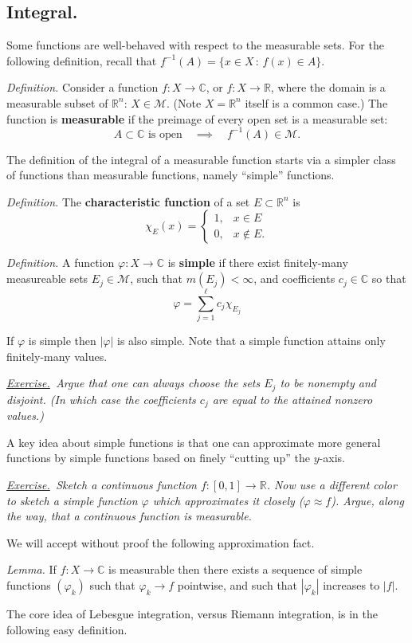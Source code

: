 \documentclass[12pt]{article}
\newcommand{\cM}{\mathcal{M}}
\newcommand{\CC}{\mathbb{C}}
\newcommand{\RR}{\mathbb{R}}
\newcommand{\sect}[1]{\subsection*{#1.}}
\newcommand{\defin}{\emph{Definition.}\,\,}
\newcommand{\lem}{\emph{Lemma.}\,\,}
\newcommand{\exer}[2]{\emph{\underline{Exercise.}\, #2} \vspace*{#1mm}}
\begin{document}
\sect{Integral}

Some functions are well-behaved with respect to the measurable sets.  For the following definition, recall that $f^{-1}(A)=\{x\in X\,:\,f(x)\in A\}$.

\defin Consider a function $f:X\to\CC$, or $f:X\to \RR$, where the domain is a measurable subset of $\RR^n$: $X \in \cM$.  (Note $X=\RR^n$ itself is a common case.)  The function is \textbf{measurable} if the preimage of every open set is a measurable set:
	$$A \subset \CC \text{ is open} \quad \implies \quad f^{-1}(A) \in \cM.$$


The definition of the integral of a measurable function starts via a simpler class of functions than measurable functions, namely ``simple'' functions.

\defin The \textbf{characteristic function} of a set $E \subset \RR^n$ is
	$$\chi_E(x) = \begin{cases} 1, & x\in E \\ 0, & x \notin E. \end{cases}$$

\defin A function $\varphi:X\to \CC$ is \textbf{simple} if there exist finitely-many measureable sets $E_j \in \cM$, such that $m(E_j)<\infty$, and coefficients $c_j \in \CC$ so that
	$$\boxed{\varphi = \sum_{j=1}^\ell c_j \chi_{E_j}}$$

If $\varphi$ is simple then $|\varphi|$ is also simple.  Note that a simple function attains only finitely-many values.

\exer{55}{Argue that one can always choose the sets $E_j$ to be nonempty and disjoint.  (In which case the coefficients $c_j$ are equal to the attained nonzero values.)}

A key idea about simple functions is that one can approximate more general functions by simple functions based on finely ``cutting up'' the $y$-axis.

\exer{50}{Sketch a continuous function $f:[0,1]\to\RR$.  Now use a different color to sketch a simple function $\varphi$ which approximates it closely ($\varphi\approx f$).  Argue, along the way, that a continuous function is measurable.}

We will accept without proof the following approximation fact.

\lem If $f:X\to \CC$ is measurable then there exists a sequence of simple functions $(\varphi_k)$ such that $\varphi_k \to f$ pointwise, and such that $|\varphi_k|$ increases to $|f|$.

The core idea of Lebesgue integration, versus Riemann integration, is in the following easy definition.
\end{document}
